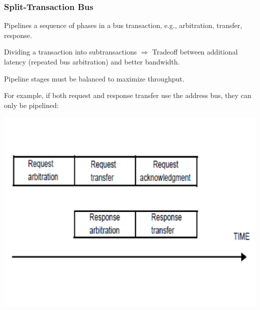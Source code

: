 \documentclass{beamer}
\begin{document}
\begin{frame}[fragile,t]
\frametitle{Split-Transaction Bus}

Pipelines a sequence of phases in a bus transaction,
e.g., arbitration, transfer, response.\bigskip

Dividing a transaction into subtransactions $\Rightarrow$
Tradeoff between additional latency (repeated bus arbitration) and better bandwidth.\bigskip

Pipeline stages must be balanced to maximize throughput.\bigskip

For example, if both request and response transfer use the address bus,
they can only be pipelined:
\vspace{-4ex}

\includegraphics[width=44ex]{FigsInfCoherence/SplitTransBus}

\end{frame}
\end{document}
